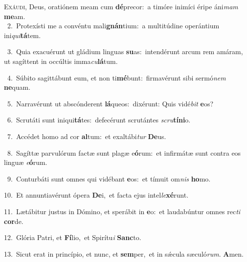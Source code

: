 \lettrine{\initial\textcolor{\initialcolor}{E}}{xáudi,} Deus, oratiónem meam cum \textbf{dé}\-precor:~\star a timóre inimíci éripe áni\textit{mam} \textbf{me}\-am.\\
{\numbfont\textcolor{\numbcolor}{~2.}}~Protexísti me a convéntu mali\-\textbf{gnán}\-tium:~\star a multitúdine operántium ini\-\textit{qui}\-\textbf{tá}tem.\par
{\numbfont\textcolor{\numbcolor}{~3.}}~Quia exacuérunt ut gládium linguas \textbf{su}\-as:~\star intendérunt arcum rem amáram, ut sagíttent in occúltis imma\-\textit{cu}\-\textbf{lá}tum.\par
{\numbfont\textcolor{\numbcolor}{~4.}}~Súbito sagittábunt eum, et non ti\-\textbf{mé}\-bunt:~\star firmavérunt sibi sermó\textit{nem} \textbf{ne}\-quam.\par
{\numbfont\textcolor{\numbcolor}{~5.}}~Narravérunt ut abscónderent \textbf{lá}\-queos:~\star dixérunt: Quis vidé\textit{bit} \textbf{e}\-os?\par
{\numbfont\textcolor{\numbcolor}{~6.}}~Scrutáti sunt iniqui\-\textbf{tá}\-tes:~\star defecérunt scrutántes \textit{scru}\-\textbf{tí}\textbf{ni}o.\par
{\numbfont\textcolor{\numbcolor}{~7.}}~Accédet homo ad cor \textbf{al}\-tum:~\star et exaltábi\textit{tur} \textbf{De}\-us.\par
{\numbfont\textcolor{\numbcolor}{~8.}}~Sagíttæ parvulórum factæ sunt plagæ e\-\textbf{ó}\-rum:~\star et infirmátæ sunt contra eos linguæ \textit{e}\-\textbf{ó}rum.\par
{\numbfont\textcolor{\numbcolor}{~9.}}~Conturbáti sunt omnes qui vidébant \textbf{e}\-os:~\star et tímuit om\textit{nis} \textbf{ho}\-mo.\par
{\numbfont\textcolor{\numbcolor}{10.}}~Et annuntiavérunt ópera \textbf{De}\-i,~\star et facta ejus intel\-\textit{le}\-\textbf{xé}runt.\par
{\numbfont\textcolor{\numbcolor}{11.}}~Lætábitur justus in Dómino, et sperábit in \textbf{e}\-o:~\star et laudabúntur omnes rec\textit{ti} \textbf{cor}\-de.\par
{\numbfont\textcolor{\numbcolor}{12.}}~Glória Patri, et \textbf{Fí}\-lio,~\star et Spirítu\textit{i} \textbf{Sanc}\-to.\par
{\numbfont\textcolor{\numbcolor}{13.}}~Sicut erat in princípio, et nunc, et \textbf{sem}\-per,~\star et in sǽcula sæculó\-\textit{rum}\-. \textbf{A}\-men.\par
